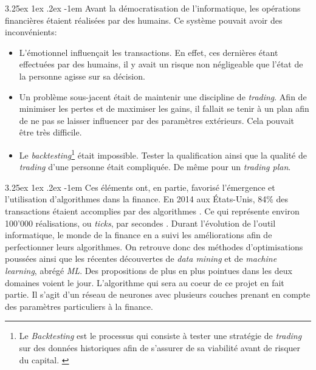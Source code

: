 \documentclass[a4paper, 11pt]{article}
\makeatletter
\renewcommand\paragraph{\@startsection{paragraph}{5}{\z@}%
  {3.25ex \@plus1ex \@minus.2ex}%
  {-1em}%
  {\normalfont\normalsize\bfseries}}
\makeatother
\begin{document}
\paragraph{}
Avant la démocratisation de l'informatique, les opérations financières étaient réalisées par des humains. 
Ce système pouvait avoir des inconvénients:
\begin{itemize}
\item L'émotionnel influençait les transactions. En effet, ces dernières étant effectuées par des humains, 
il y avait un risque non négligeable que l'état de la personne agisse sur sa décision.

\item Un problème sous-jacent était de maintenir une discipline de \textit{trading}. 
Afin de minimiser les pertes et de maximiser les gains, il fallait se tenir à un plan afin de ne pas se laisser 
influencer par des paramètres extérieurs. Cela pouvait être très difficile.

\item Le \textit{backtesting}\footnote{Le \textit{Backtesting} est le processus qui consiste à tester une stratégie
de \textit{trading} sur des données historiques afin de s'assurer de sa viabilité avant de risquer du capital.
\cite{investopedia_backtesting}} 
était impossible. Tester la qualification ainsi que la qualité de \textit{trading} d'une personne était compliquée. 
De même pour un \textit{trading plan}.
\end{itemize}

\paragraph{}
Ces éléments ont, en partie, favorisé l'émergence et l'utilisation d'algorithmes dans la finance. 
En 2014 aux États-Unis, 84\% des transactions étaient accomplies par des algorithmes \cite{real_investors}. 
Ce qui représente environ 100'000 réalisations, ou \textit{ticks}, par secondes \cite{real_investors}.
Durant l'évolution de l'outil informatique, le monde de la finance en a suivi les améliorations afin de perfectionner 
leurs algorithmes. On retrouve donc des méthodes d'optimisations poussées ainsi que les récentes découvertes 
de \textit{data mining} et de \textit{machine learning}, abrégé \textit{ML}. 
Des propositions de plus en plus pointues dans les deux domaines voient le jour. 
L'algorithme qui sera au coeur de ce projet en fait partie. 
Il s'agit d'un réseau de neurones avec plusieurs couches prenant en compte des paramètres particuliers à la finance.
\end{document}
